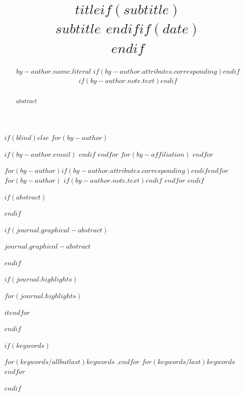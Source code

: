 
\begin{frontmatter}
\title{$title$$if(subtitle)$ \\\large{$subtitle$} $endif$$if(date)$ \\\normalsize{}$endif$}
$if(blind)$$else$
$for(by-author)$\author[$for(by-author.affiliations)$$it.number$$sep$,$endfor$]{$by-author.name.literal$%
$if(by-author.attributes.corresponding)$$endif$%
$if(by-author.note.text)$$endif$}
$if(by-author.email)$  $endif$
$endfor$
$for(by-affiliation)$
$endfor$

$for(by-author)$$if(by-author.attributes.corresponding)$$endif$$endfor$
$for(by-author)$
$if(by-author.note.text)$$endif$
$endfor$
$endif$
        
$if(abstract)$
\begin{abstract}
$abstract$
\end{abstract}
$endif$

$if(journal.graphical-abstract)$\begin{graphicalabstract}
$journal.graphical-abstract$
\end{graphicalabstract}
$endif$

$if(journal.highlights)$\begin{highlights}
$for(journal.highlights)$\item $it$$endfor$
\end{highlights}
$endif$

$if(keywords)$
\begin{keyword}
    $for(keywords/allbutlast)$$keywords$ \sep $endfor$
    $for(keywords/last)$$keywords$$endfor$
\end{keyword}
$endif$
\end{frontmatter}
    